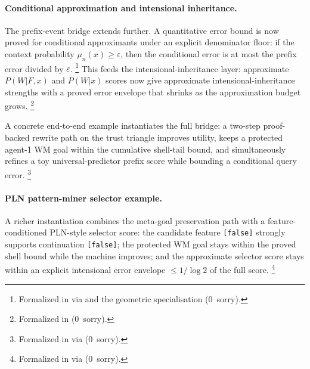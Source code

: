 \documentclass[11pt,openany]{report}
\begin{document}
\paragraph{Conditional approximation and intensional inheritance.}

The prefix-event bridge extends further.  A quantitative error bound
is now proved for conditional approximants under an explicit denominator
floor: if the context probability $\mu_n(x) \ge \varepsilon$, then the
conditional error is at most the prefix error divided by $\varepsilon$.%
\footnote{Formalized in
via 
and the geometric specialisation
(0~sorry).}
This feeds the intensional-inheritance layer: approximate $P(W|F,x)$ and
$P(W|x)$ scores now give approximate intensional-inheritance strengths with a
proved error envelope that shrinks as the approximation budget
grows.%
\footnote{Formalized in
(0~sorry).}

A concrete end-to-end example instantiates the full bridge: a two-step
proof-backed rewrite path on the trust triangle improves utility, keeps a
protected agent-1 WM goal within the cumulative shell-tail bound, and
simultaneously refines a toy universal-predictor prefix score while bounding
a conditional query error.%
\footnote{Formalized in
via  (0~sorry).}

\paragraph{PLN pattern-miner selector example.}

A richer instantiation combines the meta-goal preservation path with a
feature-conditioned PLN-style selector score: the candidate feature
\texttt{[false]} strongly supports continuation \texttt{[false]}; the
protected WM goal stays within the proved shell bound while the machine
improves; and the approximate selector score stays within an explicit
intensional error envelope $\le 1/\log 2$ of the full score.%
\footnote{Formalized in
via 
(0~sorry).}
\end{document}
